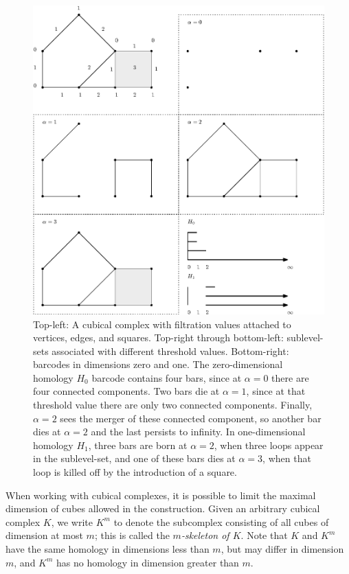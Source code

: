 \documentclass[conference]{IEEEtran}
\theoremstyle{definition}
\numberwithin{figure}{section}
\begin{document}
\begin{figure}
	\centering
	\includegraphics[scale=0.5]{cubpers.eps}
	\caption{Top-left: A cubical complex with filtration values attached to vertices, edges, and squares. Top-right through bottom-left: sublevel-sets associated with different threshold values. Bottom-right: barcodes in dimensions zero and one. The zero-dimensional homology $H_0$ barcode contains four bars, since at $\alpha=0$ there are four connected components. Two bars die at $\alpha=1$, since at that threshold value there are only two connected components. Finally, $\alpha=2$ sees the merger of these connected component, so another bar dies at $\alpha=2$ and the last persists to infinity. In one-dimensional homology $H_1$, three bars are born at $\alpha = 2$, when three loops appear in the sublevel-set, and one of these bars dies at $\alpha=3$, when that loop is killed off by the introduction of a square.}
	\label{fig:cubpers}
\end{figure}

When working with cubical complexes, it is possible to limit the maximal dimension of cubes allowed in the construction. Given an arbitrary cubical complex $K$, we write $K^m$ to denote the subcomplex consisting of all cubes of dimension at most $m$; this is called the \emph{$m$-skeleton of $K$}. Note that $K$ and $K^m$ have the same homology in dimensions less than $m$, but may differ in dimension $m$, and $K^m$ has no homology in dimension greater than $m$.
\end{document}
